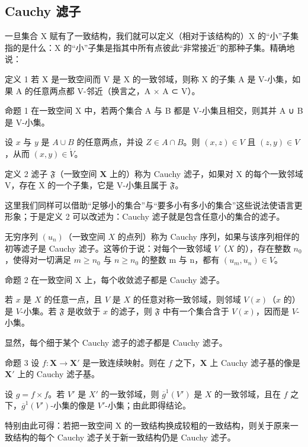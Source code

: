 \subsection{Cauchy 滤子}

一旦集合 X 赋有了一致结构，我们就可以定义（相对于该结构的）X 的“小”子集指的是什么：X 的“小”子集是指其中所有点彼此“非常接近”的那种子集。精确地说：

定义 1 若 X 是一致空间而 V 是 X 的一致邻域，则称 X 的子集 A 是 V-小集，如果 A 的任意两点都 V-邻近（换言之，A × A ⊂ V）。

命题 1 在一致空间 X 中，若两个集合 A 与 B 都是 V-小集且相交，则其并 A ∪ B 是 V-小集。

设 \(x\) 与 \(y\) 是 \(A \cup B\) 的任意两点，并设 \(Z \in A \cap B\)。则 \((x, z) \in V\) 且 \((z, y) \in V\)，从而 \((x, y) \in \mathring{V}\)。

定义 2 滤子 \(\mathfrak{F}\)（一致空间 \(\mathbf{X}\) 上的）称为 Cauchy 滤子，如果对 X 的每个一致邻域 V，存在 X 的一个子集，它是 V-小集且属于 \(\mathfrak{F}\)。

这里我们同样可以借助“足够小的集合”与“要多小有多小的集合”这些说法使语言更形象；于是定义 2 可以改述为：Cauchy 滤子就是包含任意小的集合的滤子。

无穷序列 \((u_n)\)（一致空间 \(X\) 的点列）称为 Cauchy 序列，如果与该序列相伴的初等滤子是 Cauchy 滤子。这等价于说：对每个一致邻域 \(V\)（\(X\) 的），存在整数 \(n_0\)，使得对一切满足 \(m \geqslant n_0\) 与 \(n \geqslant n_0\) 的整数 m 与 n，都有 \((u_m, u_n) \in V\)。

命题 2 在一致空间 X 上，每个收敛滤子都是 Cauchy 滤子。

若 \(x\) 是 \(X\) 的任意一点，且 \(V\) 是 \(X\) 的任意对称一致邻域，则邻域 \(V(x)\)（\(x\) 的）是 \(V\)-小集。若 \(\mathfrak{F}\) 是收敛于 \(x\) 的滤子，则 \(\mathfrak{F}\) 中有一个集合含于 \(V(x)\)，因而是 \(V\)-小集。

显然，每个细于某个 Cauchy 滤子的滤子都是 Cauchy 滤子。

命题 3 设 \(f: \mathbf{X} \to \mathbf{X}'\) 是一致连续映射。则在 \(f\) 之下，\(\mathbf{X}\) 上 Cauchy 滤子基的像是 \(\mathbf{X}'\) 上的 Cauchy 滤子基。

设 \(g = f \times f\)。若 \(V'\) 是 \(X'\) 的一致邻域，则 \(\overline{g}^1(V')\) 是 \(X\) 的一致邻域，且在 \(f\) 之下，\(\overline{g}^1(V')\)-小集的像是 \(V'\)-小集；由此即得结论。

特别由此可得：若把一致空间 X 的一致结构换成较粗的一致结构，则关于原来一致结构的每个 Cauchy 滤子关于新一致结构仍是 Cauchy 滤子。


